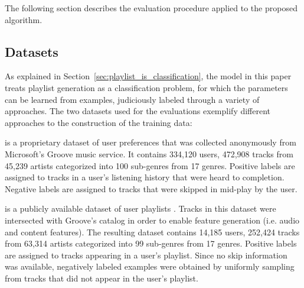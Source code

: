 The following section describes the evaluation procedure applied to the proposed algorithm. 

\subsection{Datasets}
As explained in Section~\ref{sec:playlist_is_classification}, the model in this paper treats playlist generation
as a classification problem, for which the parameters can be
learned from examples, judiciously labeled through a variety of approaches.
The  two datasets  used for the evaluations exemplify different approaches to the construction of the training data:

is a proprietary dataset of user preferences that was collected anonymously from Microsoft's Groove music service.
It contains 334,120 users, 472,908 tracks from 45,239 artists categorized into 100 sub-genres from 17 genres. Positive labels
are assigned to tracks in a user's listening history that were heard to completion. Negative labels are assigned to tracks that were skipped in mid-play by the user.

is a publicly available dataset of user playlists \cite{DBLP:conf/recsys/TurrinQCPC15}. Tracks in this dataset were intersected with Groove's catalog in order to enable feature generation (i.e. audio and content features). The resulting dataset contains 14,185 users, 252,424 tracks from 63,314 artists categorized into 99 sub-genres from 17 genres. Positive labels are assigned to tracks appearing in a user's playlist. Since no skip information was available, negatively labeled examples were obtained by uniformly sampling from tracks that did not appear in the user's playlist.


